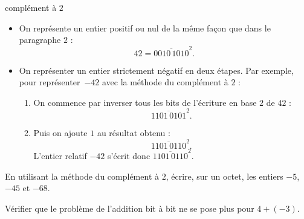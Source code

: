 \documentclass[a4paper,dvipsnames]{article}
\begin{document}
\smallskip

\begin{methode}{complément à $2$}{}
  \begin{itemize}
    \item On représente {\color{red}un entier positif ou nul de la même façon} que dans le paragraphe $2$ :
      \[42 = \overline{0010\,1010}^2.\]
    \item On représenter {\color{red}un entier strictement négatif} en deux étapes. Par exemple, pour représenter~$-42$ avec la méthode du complément à $2$ :
      \begin{enumerate}
	\item On commence par {\color{red}inverser tous les bits} de l'écriture en base $2$ de $42$ :
	  \[\overline{1101\,0101}^2.\]
	\item Puis {\color{red}on ajoute $1$} au résultat obtenu :
	  \[\overline{1101\,0110}^2.\]
	  L'entier relatif $-42$ s'écrit donc $\overline{1101\,0110}^2$.
      \end{enumerate}
  \end{itemize}
\end{methode}

\smallskip

\begin{exercice}{}{}
  En utilisant la méthode du complément à $2$, écrire, sur un octet, les entiers $-5$, $-45$ et $-68$.
\end{exercice}

\smallskip

\begin{exercice}{}{}
  Vérifier que le problème de l'addition bit à bit ne se pose plus pour $4+(-3)$.
\end{exercice}
\end{document}
